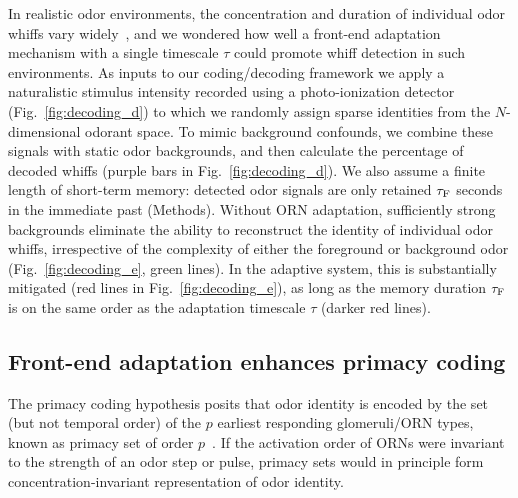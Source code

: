 \documentclass[9pt,twocolumn,twoside,lineno]{pnas-new}
\begin{document}
In realistic odor environments, the concentration and duration of individual odor whiffs vary widely~\cite{celani}, and we wondered how well a front-end adaptation mechanism with a single timescale $\tau$ could promote whiff detection in such environments. As inputs to our coding/decoding framework we apply a naturalistic stimulus intensity recorded using a photo-ionization detector~\cite{srinivas_elife} (Fig.~\ref{fig:decoding_d}) to which we randomly assign sparse identities from the $N$-dimensional odorant space. To mimic background confounds, we combine these signals with static odor backgrounds, and then calculate the percentage of decoded whiffs (purple bars in Fig.~\ref{fig:decoding_d}). We also assume a finite length of short-term memory: detected odor signals are only retained $\tau_{\textup {F}}$ seconds in the immediate past (Methods). Without ORN adaptation, sufficiently strong backgrounds eliminate the ability to reconstruct the identity of individual odor whiffs, irrespective of the complexity of either the foreground or background odor (Fig.~\ref{fig:decoding_e}, green lines). In the adaptive system, this is substantially mitigated (red lines in Fig.~\ref{fig:decoding_e}), as long as the memory duration $\tau_{\textup {F}}$ is on the same order as the adaptation timescale $\tau$ (darker red lines). %





\subsection*{Front-end adaptation enhances primacy coding}

The primacy coding hypothesis posits that odor identity is encoded by the set (but not temporal order) of the $p$ earliest responding glomeruli/ORN types, known as primacy set of order $p$~\cite{primacy_coding}. If the activation order of ORNs were invariant to the strength of an odor step or pulse, primacy sets would in principle form concentration-invariant representation of odor identity. 
\end{document}
